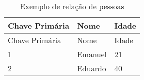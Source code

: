\begin{longtable}[]{@{}lll@{}}
\caption{Exemplo de relação de pessoas \label{tab: pessoa}}\tabularnewline
\toprule
Chave Primária & Nome & Idade \tabularnewline
\midrule
\endfirsthead
\toprule
Chave Primária & Nome & Idade\tabularnewline
\midrule
\endhead
1 & Emanuel & 21\tabularnewline
2 & Eduardo & 40\tabularnewline
\bottomrule
\end{longtable}



